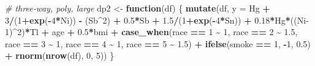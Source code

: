 \documentclass[12pt, twoside]{amherstthesis}
\newenvironment{Shaded}{\begin{snugshade}}{\end{snugshade}}
\newcommand{\AttributeTok}[1]{\textcolor[rgb]{0.13,0.29,0.53}{#1}}
\newcommand{\CommentTok}[1]{\textcolor[rgb]{0.56,0.35,0.01}{\textit{#1}}}
\newcommand{\ControlFlowTok}[1]{\textcolor[rgb]{0.13,0.29,0.53}{\textbf{#1}}}
\newcommand{\DecValTok}[1]{\textcolor[rgb]{0.00,0.00,0.81}{#1}}
\newcommand{\FloatTok}[1]{\textcolor[rgb]{0.00,0.00,0.81}{#1}}
\newcommand{\FunctionTok}[1]{\textcolor[rgb]{0.13,0.29,0.53}{\textbf{#1}}}
\newcommand{\NormalTok}[1]{#1}
\newcommand{\OtherTok}[1]{\textcolor[rgb]{0.56,0.35,0.01}{#1}}
\newcommand{\SpecialCharTok}[1]{\textcolor[rgb]{0.81,0.36,0.00}{\textbf{#1}}}
\begin{document}
\begin{Shaded}
\begin{Highlighting}[]
\CommentTok{\# three{-}way, poly, large}
\NormalTok{dp2 }\OtherTok{\textless{}{-}} \ControlFlowTok{function}\NormalTok{(df) \{}
  \FunctionTok{mutate}\NormalTok{(df, }\AttributeTok{y =} 
\NormalTok{           Hg }\SpecialCharTok{+} \DecValTok{3}\SpecialCharTok{/}\NormalTok{(}\DecValTok{1}\SpecialCharTok{+}\FunctionTok{exp}\NormalTok{(}\SpecialCharTok{{-}}\DecValTok{4}\SpecialCharTok{*}\NormalTok{Ni)) }\SpecialCharTok{{-}}\NormalTok{ (Sb}\SpecialCharTok{\^{}}\DecValTok{2}\NormalTok{) }\SpecialCharTok{+} \FloatTok{0.5}\SpecialCharTok{*}\NormalTok{Sb }\SpecialCharTok{+} \FloatTok{1.5}\SpecialCharTok{/}\NormalTok{(}\DecValTok{1}\SpecialCharTok{+}\FunctionTok{exp}\NormalTok{(}\SpecialCharTok{{-}}\DecValTok{4}\SpecialCharTok{*}\NormalTok{Sn)) }\SpecialCharTok{+} 
           \FloatTok{0.18}\SpecialCharTok{*}\NormalTok{Hg}\SpecialCharTok{*}\NormalTok{((Ni}\DecValTok{{-}1}\NormalTok{)}\SpecialCharTok{\^{}}\DecValTok{2}\NormalTok{)}\SpecialCharTok{*}\NormalTok{Tl }\SpecialCharTok{+}
\NormalTok{           age }\SpecialCharTok{+} \FloatTok{0.5}\SpecialCharTok{*}\NormalTok{bmi }\SpecialCharTok{+} 
           \FunctionTok{case\_when}\NormalTok{(race }\SpecialCharTok{==} \DecValTok{1} \SpecialCharTok{\textasciitilde{}} \DecValTok{1}\NormalTok{, }
\NormalTok{                     race }\SpecialCharTok{==} \DecValTok{2} \SpecialCharTok{\textasciitilde{}} \FloatTok{1.5}\NormalTok{, }
\NormalTok{                     race }\SpecialCharTok{==} \DecValTok{3} \SpecialCharTok{\textasciitilde{}} \DecValTok{1}\NormalTok{, }
\NormalTok{                     race }\SpecialCharTok{==} \DecValTok{4} \SpecialCharTok{\textasciitilde{}} \DecValTok{1}\NormalTok{, }
\NormalTok{                     race }\SpecialCharTok{==} \DecValTok{5} \SpecialCharTok{\textasciitilde{}} \FloatTok{1.5}\NormalTok{) }\SpecialCharTok{+}
           \FunctionTok{ifelse}\NormalTok{(smoke }\SpecialCharTok{==} \DecValTok{1}\NormalTok{, }\SpecialCharTok{{-}}\DecValTok{1}\NormalTok{, }\FloatTok{0.5}\NormalTok{) }\SpecialCharTok{+}
           \FunctionTok{rnorm}\NormalTok{(}\FunctionTok{nrow}\NormalTok{(df), }\DecValTok{0}\NormalTok{, }\DecValTok{5}\NormalTok{))}
\NormalTok{\}}
\end{Highlighting}
\end{Shaded}
\normalsize
\end{document}
